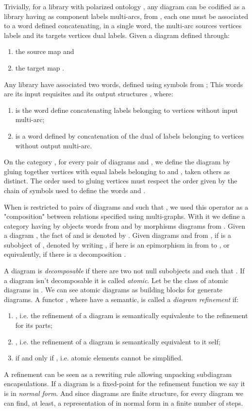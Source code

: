 \documentclass[oribibl]{llncs}
\begin{document}
Trivially, for a library  with polarized ontology
, any diagram  can be
codified as a library 
having as component labels multi-arcs, from , each one must be associated to a word defined concatenating, in a single word, the multi-arc sources vertices labels and its targets vertices dual labels. Given a diagram  defined through:
\begin{enumerate}
  \item the source map  and
  \item the target map .
\end{enumerate}
Any library  have associated two words, defined using symbols from  ; This words are its
input requisites  and its output structures , where:
\begin{enumerate}
  \item  is the word define concatenating labels belonging to vertices without input multi-arc;
  \item  is a word defined by concatenation of the dual of labels belonging to vertices without output multi-arc.
\end{enumerate}

On the category , for every pair of diagrams
 and , we define the diagram  by gluing
together vertices with equal labels belonging to  and , taken others as distinct. The order used to gluing vertices must respect the order given by the chain of symbols used to define the words  and .

When   is restricted to pairs of diagrams  and 
such that , we used this operator as a "composition"
between relations specified using multi-graphs. With it we define a
category having by objects words from 
and by morphisms diagrams from . Given a
diagram , the fact of  and  is denoted by
. Given diagrams  and
 from , if  is a subobject of , denoted by writing , if here is an epimorphism in  from  to , or equivalently, if there is a decomposition .

A diagram  is \emph{decomposable} if there are two not null subobjects  and  such that . If a diagram isn't decomposable it is called \emph{atomic}. Let  be the class of atomic diagrams in . We can see atomic diagrams as building blocks for generate diagrams. A functor , where  have a semantic, is called a \emph{diagram refinement} if:
\begin{enumerate}
  \item , i.e. the refinement of a diagram is semantically equivalente to the refinement for its parts;
  \item , i.e. the refinement of a diagram is semantically equivalent to it self;
  \item  if and only if , i.e. atomic elements cannot be simplified.
\end{enumerate}
A refinement can be seen as a rewriting rule allowing unpacking subdiagram encapsulations. If a diagram is a fixed-point for the refinement function we say it is in \emph{normal form}. And since diagrams are finite structure, for every diagram  we can find, at least, a representation of  in normal form in a finite number of steps.
\end{document}
